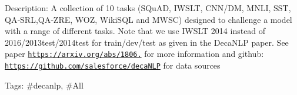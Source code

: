 Description\+: A collection of 10 tasks (S\+Qu\+AD, I\+W\+S\+LT, C\+N\+N/\+DM, M\+N\+LI, S\+ST, Q\+A‑\+S\+RL,Q\+A‑\+Z\+RE, W\+OZ, Wiki\+S\+QL and M\+W\+SC) designed to challenge a model with a range of different tasks. Note that we use I\+W\+S\+LT 2014 instead of 2016/2013test/2014test for train/dev/test as given in the Deca\+N\+LP paper. See paper \href{https://arxiv.org/abs/1806.08730}{\tt https\+://arxiv.\+org/abs/1806.} for more information and github\+: \href{https://github.com/salesforce/decaNLP}{\tt https\+://github.\+com/salesforce/deca\+N\+LP} for data sources

Tags\+: \#decanlp, \#\+All 